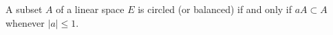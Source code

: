 A subset $A$ of a linear space $E$ is circled (or balanced) if and only if $aA \subset A$ whenever $|a| \leq 1$.
